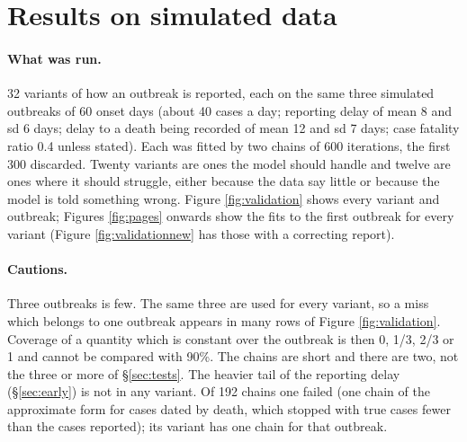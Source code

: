 \documentclass[11pt,a4paper]{article}
\begin{document}
\section{Results on simulated data}\label{sec:results}

\paragraph{What was run.} 32 variants of how an outbreak is reported, each
on the same three simulated outbreaks of 60 onset days (about 40 cases a
day; reporting delay of mean 8 and sd 6 days; delay to a death being
recorded of mean 12 and sd 7 days; case fatality ratio 0.4 unless stated).
Each was fitted by two chains of 600 iterations, the first 300 discarded.
Twenty variants are ones the model should handle and twelve are ones where
it should struggle, either because the data say little or because the
model is told something wrong. Figure \ref{fig:validation} shows every
variant and outbreak; Figures \ref{fig:pages} onwards show the fits to the
first outbreak for every variant (Figure \ref{fig:validationnew} has those
with a correcting report).

\paragraph{Cautions.} Three outbreaks is few. The same three are used for
every variant, so a miss which belongs to one outbreak appears in many rows
of Figure \ref{fig:validation}. Coverage of a quantity which is constant
over the outbreak is then 0, 1/3, 2/3 or 1 and cannot be compared with
90\%. The chains are short and there are two, not the three or more of
\S\ref{sec:tests}. The heavier tail of the reporting delay
(\S\ref{sec:early}) is not in any variant. Of 192 chains one failed (one
chain of the approximate form for cases dated by death, which stopped with
true cases fewer than the cases reported); its variant has one chain for
that outbreak.
\end{document}
